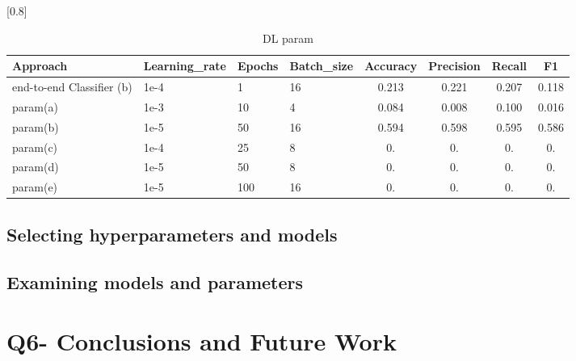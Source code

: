 \documentclass[a4paper,11pt]{article}
\begin{document}
\begin{table}[htbp]
    \caption{DL param}
    \small
    \scalebox{0.8}[0.8]{
    \begin{tabular}{l|lll|cccc}
         Approach & Learning\_rate & Epochs & Batch\_size & Accuracy & Precision & Recall & F1 \\ \hline 
         end-to-end Classifier (b) & 1e-4& 1 & 16 & 0.213 & 0.221 &0.207 & 0.118 \\
         param(a)                  & 1e-3& 10& 4  & 0.084 & 0.008 & 0.100 & 0.016 \\
         param(b)                  & 1e-5& 50& 16 & 0.594 & 0.598 & 0.595 & 0.586 \\
         param(c)                  & 1e-4& 25& 8  & 0. & 0. & 0.  & 0. \\ \hline
         param(d)                  & 1e-5& 50& 8  & 0. & 0. & 0.  & 0. \\
         param(e)                  & 1e-5& 100& 16  & 0. & 0. & 0.  & 0. \\



    \end{tabular}

    }
\end{table}

\subsection{Selecting hyperparameters and models}
\subsection{Examining models and parameters}


\section{Q6- Conclusions and Future Work}
\end{document}
